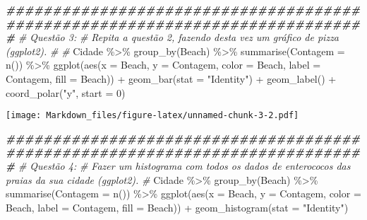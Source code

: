 \documentclass[
]{article}
\newenvironment{Shaded}{\begin{snugshade}}{\end{snugshade}}
\newcommand{\AttributeTok}[1]{\textcolor[rgb]{0.77,0.63,0.00}{#1}}
\newcommand{\CommentTok}[1]{\textcolor[rgb]{0.56,0.35,0.01}{\textit{#1}}}
\newcommand{\DecValTok}[1]{\textcolor[rgb]{0.00,0.00,0.81}{#1}}
\newcommand{\DocumentationTok}[1]{\textcolor[rgb]{0.56,0.35,0.01}{\textbf{\textit{#1}}}}
\newcommand{\FunctionTok}[1]{\textcolor[rgb]{0.00,0.00,0.00}{#1}}
\newcommand{\NormalTok}[1]{#1}
\newcommand{\SpecialCharTok}[1]{\textcolor[rgb]{0.00,0.00,0.00}{#1}}
\newcommand{\StringTok}[1]{\textcolor[rgb]{0.31,0.60,0.02}{#1}}
\begin{document}
\begin{Shaded}
\begin{Highlighting}[]
\DocumentationTok{\#\#\#\#\#\#\#\#\#\#\#\#\#\#\#\#\#\#\#\#\#\#\#\#\#\#\#\#\#\#\#\#\#\#\#\#\#\#\#\#\#\#\#\#\#\#\#\#\#\#\#\#\#\#\#\#\#\#\#\#\#\#\#\#\#\#\#\#\#\#\#\#\#\#\#\#\# }
\CommentTok{\# Questão 3:}
\CommentTok{\#   Repita a questão 2, fazendo desta vez um gráfico de pizza (ggplot2).}
\CommentTok{\#}
\CommentTok{\#}
\NormalTok{Cidade }\SpecialCharTok{\%\textgreater{}\%} \FunctionTok{group\_by}\NormalTok{(Beach) }\SpecialCharTok{\%\textgreater{}\%} \FunctionTok{summarise}\NormalTok{(}\AttributeTok{Contagem =} \FunctionTok{n}\NormalTok{()) }\SpecialCharTok{\%\textgreater{}\%} \FunctionTok{ggplot}\NormalTok{(}\FunctionTok{aes}\NormalTok{(}\AttributeTok{x =}\NormalTok{ Beach, }\AttributeTok{y =}\NormalTok{ Contagem, }\AttributeTok{color =}\NormalTok{ Beach, }\AttributeTok{label =}\NormalTok{ Contagem, }\AttributeTok{fill =}\NormalTok{ Beach)) }\SpecialCharTok{+} \FunctionTok{geom\_bar}\NormalTok{(}\AttributeTok{stat =} \StringTok{"Identity"}\NormalTok{) }\SpecialCharTok{+} \FunctionTok{geom\_label}\NormalTok{() }\SpecialCharTok{+} \FunctionTok{coord\_polar}\NormalTok{(}\StringTok{"y"}\NormalTok{, }\AttributeTok{start =} \DecValTok{0}\NormalTok{) }
\end{Highlighting}
\end{Shaded}

\texttt{[image: Markdown\_files/figure-latex/unnamed-chunk-3-2.pdf]}

\begin{Shaded}
\begin{Highlighting}[]
\DocumentationTok{\#\#\#\#\#\#\#\#\#\#\#\#\#\#\#\#\#\#\#\#\#\#\#\#\#\#\#\#\#\#\#\#\#\#\#\#\#\#\#\#\#\#\#\#\#\#\#\#\#\#\#\#\#\#\#\#\#\#\#\#\#\#\#\#\#\#\#\#\#\#\#\#\#\#\#\#\# }
\CommentTok{\# Questão 4:  }
\CommentTok{\# Fazer um histograma com todos os dados de enterococos das praias da sua cidade (ggplot2).}
\CommentTok{\#}
\NormalTok{Cidade }\SpecialCharTok{\%\textgreater{}\%} \FunctionTok{group\_by}\NormalTok{(Beach) }\SpecialCharTok{\%\textgreater{}\%} \FunctionTok{summarise}\NormalTok{(}\AttributeTok{Contagem =} \FunctionTok{n}\NormalTok{()) }\SpecialCharTok{\%\textgreater{}\%} \FunctionTok{ggplot}\NormalTok{(}\FunctionTok{aes}\NormalTok{(}\AttributeTok{x =}\NormalTok{ Beach, }\AttributeTok{y =}\NormalTok{ Contagem, }\AttributeTok{color =}\NormalTok{ Beach, }\AttributeTok{label =}\NormalTok{ Contagem, }\AttributeTok{fill =}\NormalTok{ Beach)) }\SpecialCharTok{+} \FunctionTok{geom\_histogram}\NormalTok{(}\AttributeTok{stat =} \StringTok{"Identity"}\NormalTok{)}
\end{Highlighting}
\end{Shaded}
\end{document}
